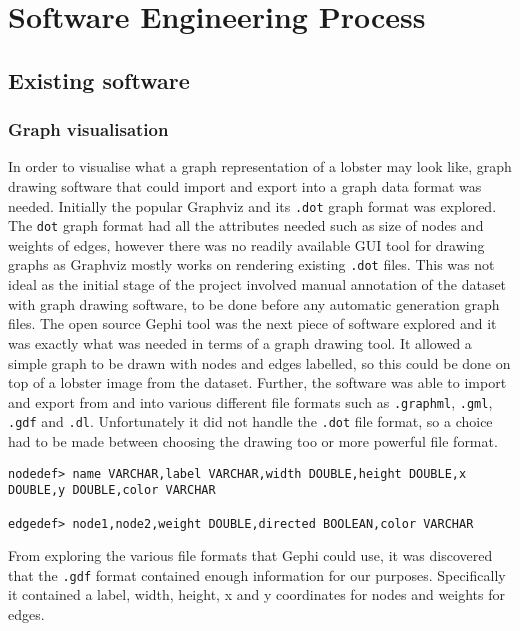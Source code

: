 \section{Software Engineering Process}


\subsection{Existing software}

\subsubsection{Graph visualisation}
In order to visualise what a graph representation of a lobster may look like, graph drawing software that could import and export into a graph data format was needed. Initially the popular Graphviz and its \texttt{.dot} graph format \cite{graphviz-dot} was explored. The \texttt{dot} graph format had all the attributes needed such as size of nodes and weights of edges, however there was no readily available GUI tool for drawing graphs as Graphviz mostly works on rendering existing \texttt{.dot} files. This was not ideal as the initial stage of the project involved manual annotation of the dataset with graph drawing software, to be done before any automatic generation graph files. 
\n
The open source Gephi \cite{gephi} tool was the next piece of software explored and it was exactly what was needed in terms of a graph drawing tool. It allowed a simple graph to be drawn with nodes and edges labelled, so this could be done on top of a lobster image from the dataset. Further, the software was able to import and export from and into various different file formats such as \texttt{.graphml}, \texttt{.gml}, \texttt{.gdf} and \texttt{.dl}. Unfortunately it did not handle the \texttt{.dot} file format, so a choice had to be made between choosing the drawing too or more powerful file format. 
\begin{lstlisting}[caption={Header formats for \texttt{.gdf} files showing the kind of node and edge data it could keep.}]
nodedef> name VARCHAR,label VARCHAR,width DOUBLE,height DOUBLE,x DOUBLE,y DOUBLE,color VARCHAR

edgedef> node1,node2,weight DOUBLE,directed BOOLEAN,color VARCHAR
\end{lstlisting}
From exploring the various file formats that Gephi could use, it was discovered that the \texttt{.gdf} format contained enough information for our purposes. Specifically it contained a label, width, height, x and y coordinates for nodes and weights for edges. 


